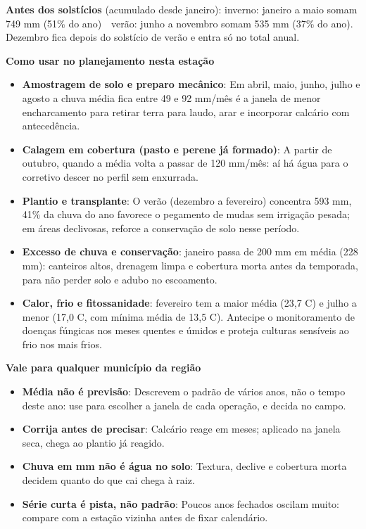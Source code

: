 \documentclass[10pt,a4paper]{article}
\begin{document}
\vspace{1pt}
{\footnotesize\textbf{Antes dos solstícios} (acumulado desde janeiro):
inverno: janeiro a maio somam 749 mm (51\% do ano) \,\textbullet\, verão: junho a novembro somam 535 mm (37\% do ano). Dezembro fica depois do solstício de verão e entra só no total
anual.}

\vspace{2pt}
{\bfseries\small Como usar no planejamento nesta estação}

\footnotesize\begin{itemize}\setlength{\itemsep}{0.5pt}
  \item \textbf{Amostragem de solo e preparo mecânico}: Em abril, maio, junho, julho e agosto a chuva média fica entre 49 e 92 mm/mês \textemdash{} é a janela de menor encharcamento para retirar terra para laudo, arar e incorporar calcário com antecedência.
  \item \textbf{Calagem em cobertura (pasto e perene já formado)}: A partir de outubro, quando a média volta a passar de 120 mm/mês: aí há água para o corretivo descer no perfil sem enxurrada.
  \item \textbf{Plantio e transplante}: O verão (dezembro a fevereiro) concentra 593 mm, 41\% da chuva do ano \textemdash{} favorece o pegamento de mudas sem irrigação pesada; em áreas declivosas, reforce a conservação de solo nesse período.
  \item \textbf{Excesso de chuva e conservação}: janeiro passa de 200 mm em média (228 mm): canteiros altos, drenagem limpa e cobertura morta antes da temporada, para não perder solo e adubo no escoamento.
  \item \textbf{Calor, frio e fitossanidade}: fevereiro tem a maior média (23,7 \textdegree{}C) e julho a menor (17,0 \textdegree{}C, com mínima média de 13,5 \textdegree{}C). Antecipe o monitoramento de doenças fúngicas nos meses quentes e úmidos e proteja culturas sensíveis ao frio nos mais frios.
\end{itemize}

\vspace{1pt}
{\bfseries\small Vale para qualquer município da região}

\scriptsize\begin{itemize}\setlength{\itemsep}{0.5pt}
  \item \textbf{Média não é previsão}: Descrevem o padrão de vários anos, não o tempo deste ano: use para escolher a janela de cada operação, e decida no campo.
  \item \textbf{Corrija antes de precisar}: Calcário reage em meses; aplicado na janela seca, chega ao plantio já reagido.
  \item \textbf{Chuva em mm não é água no solo}: Textura, declive e cobertura morta decidem quanto do que cai chega à raiz.
  \item \textbf{Série curta é pista, não padrão}: Poucos anos fechados oscilam muito: compare com a estação vizinha antes de fixar calendário.
\end{itemize}
\end{document}
